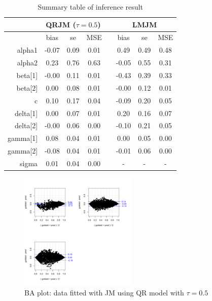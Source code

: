 \documentclass{article}
\begin{document}
\begin{table}[H]
\centering
\caption{Summary table of inference result}
\begin{tabular}{rccccccc}
\hline
& \multicolumn{3}{c}{QRJM ($\tau=0.5$)} & & \multicolumn{3}{c}{LMJM}\\
\hline
 & bias & se & MSE & & bias & se & MSE \\
 \cline{2-4}  \cline{6-8}
alpha1 & -0.07 & 0.09 & 0.01 & & 0.49 & 0.49 & 0.48 \\
  alpha2 & 0.23 & 0.76 & 0.63 & & -0.05 & 0.55 & 0.31 \\
  beta[1] & -0.00 & 0.11 & 0.01 & & -0.43 & 0.39 & 0.33 \\
  beta[2] & 0.00 & 0.08 & 0.01 & & -0.00 & 0.12 & 0.01 \\
  c & 0.10 & 0.17 & 0.04 & & -0.09 & 0.20 & 0.05 \\
  delta[1] & 0.00 & 0.07 & 0.01 & & 0.20 & 0.16 & 0.07 \\
  delta[2] & -0.00 & 0.06 & 0.00 & & -0.10 & 0.21 & 0.05 \\
  gamma[1] & 0.08 & 0.04 & 0.01 & & 0.00 & 0.05 & 0.00 \\
  gamma[2] & -0.08 & 0.04 & 0.01 & & -0.01 & 0.06 & 0.00 \\
  sigma & 0.01 & 0.04 & 0.00 & & - & - & - \\
   \hline
\end{tabular}
\end{table}


\begin{figure}[H]
\centering
\includegraphics[width=0.5\textwidth]{ba_qt50data_medianfit.pdf}
\caption{BA plot: data fitted with JM using QR model with $\tau=0.5$}
\end{figure}
\end{document}
